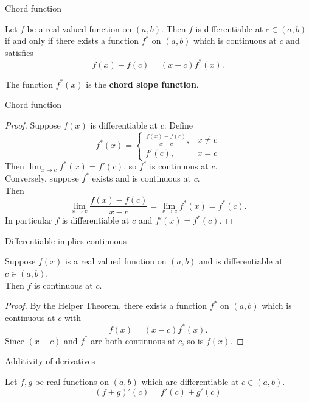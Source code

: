 \documentclass{beamer}
\begin{document}
\begin{frame}{Chord function}
\begin{thm}
Let $f$ be a real-valued function on $(a,b)$.  Then $f$ is differentiable at $c\in (a,b)$ if and only if there exists a function $f^*$ on $(a,b)$ which is continuous at $c$ and satisfies
$$f(x)-f(c) = (x-c)f^*(x).$$
\end{thm}
\pause
The function $f^*(x)$ is the \textbf{chord slope function}.
\end{frame}

\begin{frame}{Chord function}
\begin{proof}
\pause
Suppose $f(x)$ is differentiable at $c$.
\pause
Define
$$f^*(x) = \left\lbrace\begin{array}{cc}
\frac{f(x)-f(c)}{x-c}, & x\neq c\\
f'(c), & x= c
\end{array}\right.$$
\pause
Then $\lim_{x\rightarrow c} f^*(x) = f'(c)$, so $f^*$ is continuous at $c$.\\
\pause
Conversely, suppose $f^*$ exists and is continuous at $c$.\\
\pause
Then
$$\lim_{x\rightarrow c} \frac{f(x)-f(c)}{x-c} = \lim_{x\rightarrow c} f^*(x) = f^*(c).$$
\pause
In particular $f$ is differentiable at $c$ and $f'(x) = f^*(c)$.
\end{proof}
\end{frame}

\begin{frame}{Differentiable implies continuous}
\begin{thm}
Suppose $f(x)$ is a real valued function on $(a,b)$ and is differentiable at $c\in (a,b)$.\\
Then $f$ is continuous at $c$.
\end{thm}
\pause
\begin{proof}
\pause
By the Helper Theorem, there exists a function $f^*$ on $(a,b)$ which is continuous at $c$ with
$$f(x) = (x-c)f^*(x).$$
\pause
Since $(x-c)$ and $f^*$ are both continuous at $c$, so is $f(x)$.
\end{proof}
\end{frame}

\begin{frame}{Additivity of derivatives}
\begin{thm}
Let $f,g$ be real functions on $(a,b)$ which are differentiable at $c\in (a,b)$.\\
$$(f\pm g)'(c) = f'(c) \pm g'(c)$$
\end{thm}
\end{frame}
\end{document}
